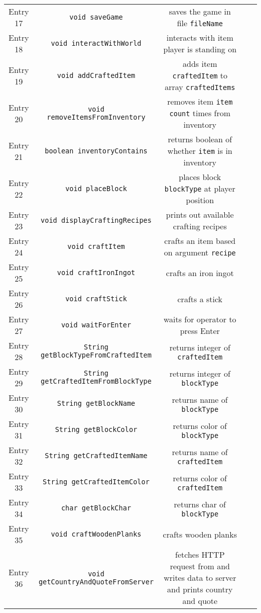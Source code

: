 \begin{table}[ht]
\begin{tabular}[t]{ccccc}
    Entry 17& \texttt{void saveGame} & saves the game in file \texttt{fileName}\\
    Entry 18& \texttt{void interactWithWorld} & interacts with item player is standing on\\
    Entry 19& \texttt{void addCraftedItem} & adds item \texttt{craftedItem} to array \texttt{craftedItems} \\
    Entry 20& \texttt{void removeItemsFromInventory} & removes item \texttt{item} \texttt{count} times from inventory\\
    Entry 21& \texttt{boolean inventoryContains} & returns boolean of whether \texttt{item} is in inventory\\
    Entry 22& \texttt{void placeBlock} & places block \texttt{blockType} at player position\\
    Entry 23& \texttt{void displayCraftingRecipes} & prints out available crafting recipes\\
    Entry 24& \texttt{void craftItem} & crafts an item based on argument \texttt{recipe}\\
    Entry 25& \texttt{void craftIronIngot} & crafts an iron ingot\\
    Entry 26& \texttt{void craftStick} & crafts a stick\\
    Entry 27& \texttt{void waitForEnter} & waits for operator to press Enter\\
    Entry 28& \texttt{String getBlockTypeFromCraftedItem} & returns integer of \texttt{craftedItem}\\
    Entry 29& \texttt{String getCraftedItemFromBlockType} & returns integer of \texttt{blockType}\\
    Entry 30& \texttt{String getBlockName} & returns name of \texttt{blockType}\\
    Entry 31& \texttt{String getBlockColor} & returns color of \texttt{blockType}\\
    Entry 32& \texttt{String getCraftedItemName} & returns name of \texttt{craftedItem}\\
    Entry 33& \texttt{String getCraftedItemColor} & returns color of \texttt{craftedItem}\\
    Entry 34& \texttt{char getBlockChar} & returns char of \texttt{blockType}\\
    Entry 35& \texttt{void craftWoodenPlanks} & crafts wooden planks\\
    Entry 36& \texttt{void getCountryAndQuoteFromServer} & fetches HTTP request from and writes data to server and prints country and quote\\
    \bottomrule
    \end{tabular}
    \label{table: style 2}
\end{table}